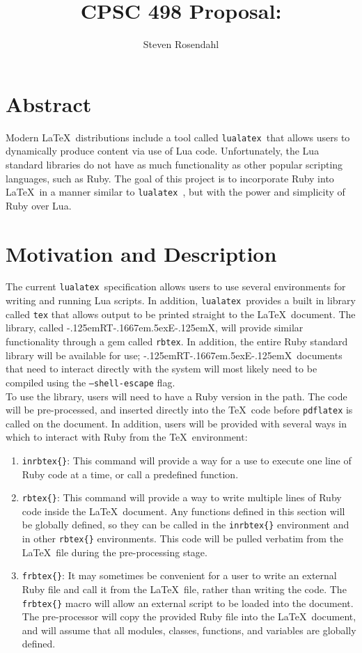 \documentclass{article}
\title{CPSC 498 Proposal: \RbTeX}
\author{Steven Rosendahl}
\date{}
\newcommand{\inlinecode}[1]{\texttt{#1}}
\newcommand{\luatex}{\inlinecode{lualatex}\ }
\newcommand{\findent}{\leavevmode{\parindent=1.3em\indent}}
\def\RbTeX{{\rm\kern-.125emR\!{\scalebox{0.7}{\lower-.5ex\hbox{B}}}\!T\kern-.1667em\lower.5ex\hbox{E}\kern-.125emX}}
\begin{document}
\maketitle
\section{Abstract}

Modern \LaTeX\ distributions include a tool called \luatex that allows users to dynamically
produce content via use of Lua code. Unfortunately, the Lua standard libraries do not have as much
functionality as other popular scripting languages, such as Ruby. The goal of this project is to
incorporate Ruby into \LaTeX\ in a manner similar to \luatex, but with the power and
simplicity of Ruby over Lua.

\section{Motivation and Description}

\findent The current \luatex specification allows users to use several environments for writing and
running Lua scripts. In addition, \luatex provides a built in library called \inlinecode{tex} that allows
output to be printed straight to the \LaTeX\ document. The library, called \RbTeX, will provide similar
functionality through a gem called \inlinecode{rbtex}. In addition, the entire Ruby standard library will
be available for use; \RbTeX\ documents that need to interact directly with the system will most likely
need to be compiled using the \inlinecode{--shell-escape} flag.\\

To use the library, users will need to have a Ruby version in the path. The code will be pre-processed,
and inserted directly into the \TeX\ code before \inlinecode{pdflatex} is called on the document. In
addition, users will be provided with several ways in which to interact with Ruby from the \TeX\
environment:

\begin{enumerate}
\item \inlinecode{inrbtex\{\}}: This command will provide a way for a use to execute one line of Ruby
code at a time, or call a predefined function.
\item \inlinecode{rbtex\{\}}: This command will provide a way to write multiple lines of Ruby code inside
the \LaTeX\ document. Any functions defined in this section will be globally defined, so they can be
called in the \inlinecode{inrbtex\{\}} environment and in other \inlinecode{rbtex\{\}} environments. This
code will be pulled verbatim from the \LaTeX\ file during the pre-processing stage.
\item \inlinecode{frbtex\{\}}: It may sometimes be convenient for a user to write an external Ruby file
and call it from the \LaTeX\ file, rather than writing the code. The \inlinecode{frbtex\{\}} macro will
allow an external script to be loaded into the document. The pre-processor will copy the provided Ruby
file into the \LaTeX\ document, and will assume that all modules, classes, functions, and variables are
globally defined.
\end{enumerate}
\end{document}
